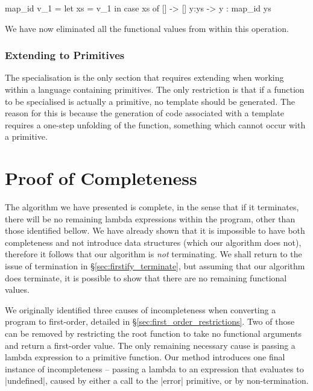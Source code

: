 \documentclass[preprint]{sigplanconf}
\begin{document}
\begin{code}
map_id v_1 =  let  xs = v_1
              in   case  xs of
                         []    -> []
                         y:ys  -> y : map_id ys
\end{code}

We have now eliminated all the functional values from within this operation.


\subsubsection{Extending to Primitives}

The specialisation is the only section that requires extending when working within a language containing primitives. The only restriction is that if a function to be specialised is actually a primitive, no template should be generated. The reason for this is because the generation of code associated with a template requires a one-step unfolding of the function, something which cannot occur with a primitive.

\section{Proof of Completeness}


The algorithm we have presented is complete, in the sense that if it terminates, there will be no remaining lambda expressions within the program, other than those identified bellow. We have already shown that it is impossible to have both completeness and not introduce data structures (which our algorithm does not), therefore it follows that our algorithm is \textit{not} terminating. We shall return to the issue of termination in \S\ref{sec:firstify_terminate}, but assuming that our algorithm does terminate, it is possible to show that there are no remaining functional values.

We originally identified three causes of incompleteness when converting a program to first-order, detailed in \S\ref{sec:first_order_restrictions}. Two of those can be removed by restricting the root function to take no functional arguments and return a first-order value. The only remaining necessary cause is passing a lambda expression to a primitive function. Our method introduces one final instance of incompleteness -- passing a lambda to an expression that evaluates to |undefined|, caused by either a call to the |error| primitive, or by non-termination.
\end{document}
